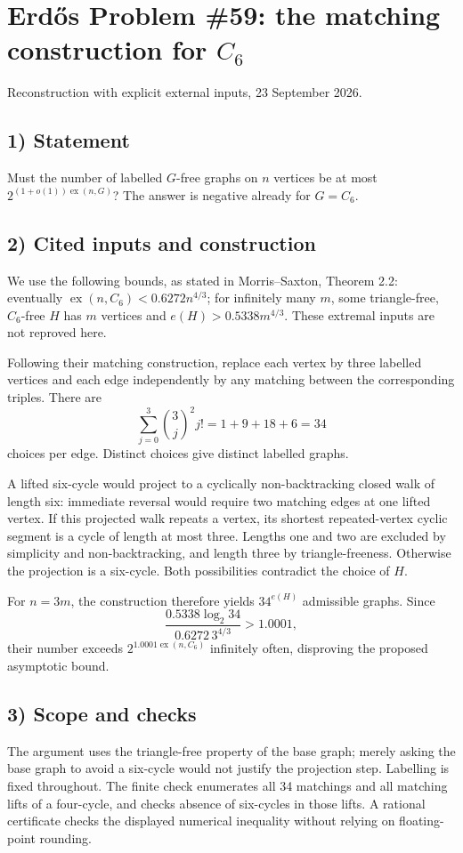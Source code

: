 \section{Erd\H{o}s Problem \#59: the matching construction for $C_6$}
\noindent Reconstruction with explicit external inputs, 23 September 2026.

\subsection*{1) Statement}
Must the number of labelled $G$-free graphs on $n$ vertices be at most $2^{(1+o(1))\operatorname{ex}(n,G)}$? The answer is negative already for $G=C_6$.

\subsection*{2) Cited inputs and construction}
We use the following bounds, as stated in Morris--Saxton, Theorem 2.2: eventually $\operatorname{ex}(n,C_6)<0.6272n^{4/3}$; for infinitely many $m$, some triangle-free, $C_6$-free $H$ has $m$ vertices and $e(H)>0.5338m^{4/3}$. These extremal inputs are not reproved here.

Following their matching construction, replace each vertex by three labelled vertices and each edge independently by any matching between the corresponding triples. There are
\[
 \sum_{j=0}^3\binom3j^2j!=1+9+18+6=34
\]
choices per edge. Distinct choices give distinct labelled graphs.

A lifted six-cycle would project to a cyclically non-backtracking closed walk of length six: immediate reversal would require two matching edges at one lifted vertex. If this projected walk repeats a vertex, its shortest repeated-vertex cyclic segment is a cycle of length at most three. Lengths one and two are excluded by simplicity and non-backtracking, and length three by triangle-freeness. Otherwise the projection is a six-cycle. Both possibilities contradict the choice of $H$.

For $n=3m$, the construction therefore yields $34^{e(H)}$ admissible graphs. Since
\[
 \frac{0.5338\log_2 34}{0.6272\,3^{4/3}}>1.0001,
\]
their number exceeds $2^{1.0001\operatorname{ex}(n,C_6)}$ infinitely often, disproving the proposed asymptotic bound.

\subsection*{3) Scope and checks}
The argument uses the triangle-free property of the base graph; merely asking the base graph to avoid a six-cycle would not justify the projection step. Labelling is fixed throughout. The finite check enumerates all 34 matchings and all matching lifts of a four-cycle, and checks absence of six-cycles in those lifts. A rational certificate checks the displayed numerical inequality without relying on floating-point rounding.

